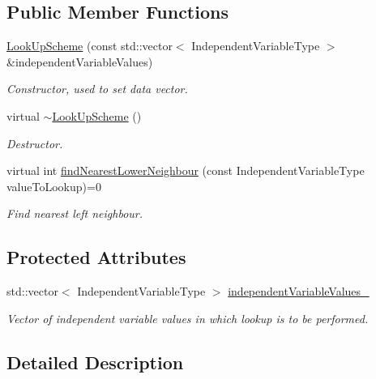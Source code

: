 \subsection*{Public Member Functions}
\begin{DoxyCompactItemize}
\item 
\hyperlink{classtudat_1_1interpolators_1_1LookUpScheme_a6e9a14c5e9a66966beba83a190f145eb}{Look\+Up\+Scheme} (const std\+::vector$<$ Independent\+Variable\+Type $>$ \&independent\+Variable\+Values)
\begin{DoxyCompactList}\small\item\em Constructor, used to set data vector. \end{DoxyCompactList}\item 
virtual \hyperlink{classtudat_1_1interpolators_1_1LookUpScheme_a61dad132b9b66c6a673d6afa811a516d}{$\sim$\+Look\+Up\+Scheme} ()
\begin{DoxyCompactList}\small\item\em Destructor. \end{DoxyCompactList}\item 
virtual int \hyperlink{classtudat_1_1interpolators_1_1LookUpScheme_a7749ee1bb2df25690a6e040a3e61f646}{find\+Nearest\+Lower\+Neighbour} (const Independent\+Variable\+Type value\+To\+Lookup)=0
\begin{DoxyCompactList}\small\item\em Find nearest left neighbour. \end{DoxyCompactList}\end{DoxyCompactItemize}
\subsection*{Protected Attributes}
\begin{DoxyCompactItemize}
\item 
std\+::vector$<$ Independent\+Variable\+Type $>$ \hyperlink{classtudat_1_1interpolators_1_1LookUpScheme_a753a3db9ce3acfe0bbb4272155360ab7}{independent\+Variable\+Values\+\_\+}
\begin{DoxyCompactList}\small\item\em Vector of independent variable values in which lookup is to be performed. \end{DoxyCompactList}\end{DoxyCompactItemize}


\subsection{Detailed Description}
